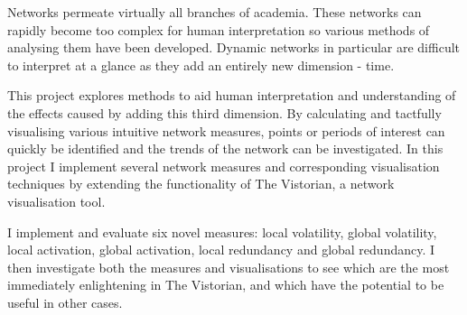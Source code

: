 

\begin{abstracts}

Networks permeate virtually all branches of academia. These networks can rapidly become too complex for human interpretation so various methods of analysing them have been developed. Dynamic networks in particular are difficult to interpret at a glance as they add an entirely new dimension - time.

This project explores methods to aid human interpretation and understanding of the effects caused by adding this third dimension. By calculating and tactfully visualising various intuitive network measures, points or periods of interest can quickly be identified and the trends of the network can be investigated. In this project I implement several network measures and corresponding visualisation techniques by extending the functionality of The Vistorian, a network visualisation tool.

I implement and evaluate six novel measures: local volatility, global volatility, local activation, global activation, local redundancy and global redundancy. I then investigate both the measures and visualisations to see which are the most immediately enlightening in The Vistorian, and which have the potential to be useful in other cases.
\end{abstracts}

